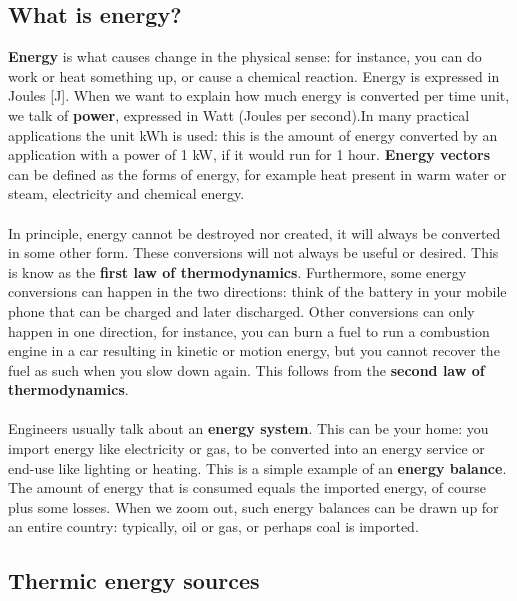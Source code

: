 \documentclass[../summary.tex]{subfiles}
\begin{document}
	\subsection{What is energy?}
	
	\textbf{Energy} is what causes change in the physical sense: for instance, you can do work or heat something up, or cause a chemical reaction. Energy is expressed in Joules [J]. When we want to explain how much energy is converted per time unit, we talk of \textbf{power}, expressed in Watt (Joules per second).In many practical applications the unit kWh is used: this is the amount of energy converted by an application with a power of 1 kW, if it would run for 1 hour. \textbf{Energy vectors} can be defined as the forms of energy, for example heat present in warm water or steam, electricity and chemical energy.
	\\\\
	In principle, energy cannot be destroyed nor created, it will always be converted in some other form. These conversions will not always be useful or desired. This is know as the \textbf{first law of thermodynamics}. Furthermore, some energy conversions can happen in the two directions: think of the battery in your mobile phone that can be charged and later discharged. Other conversions can only happen in one direction, for instance, you can burn a fuel to run a combustion engine in a car resulting in kinetic or motion energy, but you cannot recover the fuel as such when you slow down again. This follows from the \textbf{second law of thermodynamics}.
	\\\\
	Engineers usually talk about an \textbf{energy system}. This can be your home: you import energy like electricity or gas, to be converted into an energy service or end-use like lighting or heating. This is a simple example of an \textbf{energy balance}. The amount of energy that is consumed equals the imported energy, of course plus some losses. When we zoom out, such energy balances can be drawn up for an entire country: typically, oil or gas, or perhaps coal is imported.
	
	\subsection{Thermic energy sources}
	
\end{document}
